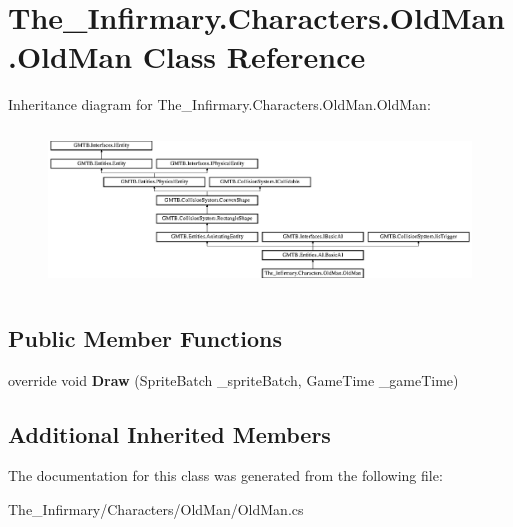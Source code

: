 \hypertarget{class_the___infirmary_1_1_characters_1_1_old_man_1_1_old_man}{}\section{The\+\_\+\+Infirmary.\+Characters.\+Old\+Man.\+Old\+Man Class Reference}
\label{class_the___infirmary_1_1_characters_1_1_old_man_1_1_old_man}
Inheritance diagram for The\+\_\+\+Infirmary.\+Characters.\+Old\+Man.\+Old\+Man\+:\begin{figure}[H]
\begin{center}
\leavevmode
\includegraphics[height=4.258555cm]{class_the___infirmary_1_1_characters_1_1_old_man_1_1_old_man}
\end{center}
\end{figure}
\subsection*{Public Member Functions}
\begin{DoxyCompactItemize}
\item 
\mbox{\label{class_the___infirmary_1_1_characters_1_1_old_man_1_1_old_man_a09caaa366e7d75fc2761468276b5bc83}} 
override void {\bfseries Draw} (Sprite\+Batch \+\_\+sprite\+Batch, Game\+Time \+\_\+game\+Time)
\end{DoxyCompactItemize}
\subsection*{Additional Inherited Members}


The documentation for this class was generated from the following file\+:\begin{DoxyCompactItemize}
\item 
The\+\_\+\+Infirmary/\+Characters/\+Old\+Man/Old\+Man.\+cs\end{DoxyCompactItemize}
